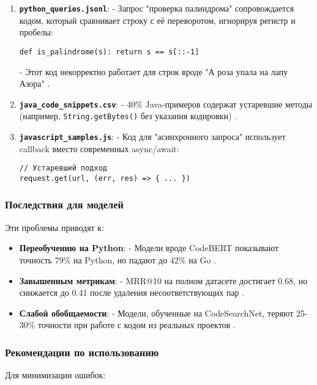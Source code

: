 \documentclass[14pt]{article}
\theoremstyle{definition}
\begin{document}
\begin{enumerate}
    \item \textbf{\texttt{python\_queries.jsonl}}:
    - Запрос "проверка палиндрома" сопровождается кодом, который сравнивает строку с её переворотом, игнорируя регистр и пробелы:
    \begin{verbatim}
def is_palindrome(s): return s == s[::-1]
    \end{verbatim}
    - Этот код некорректно работает для строк вроде "А роза упала на лапу Азора" \cite{chen2023}.
    
    \item \textbf{\texttt{java\_code\_snippets.csv}}:
    - 40\% Java-примеров содержат устаревшие методы (например, \texttt{String.getBytes()} без указания кодировки) \cite{guo2022graphcodebert}.
    
    \item \textbf{\texttt{javascript\_samples.js}}:
    - Код для "асинхронного запроса" использует callback вместо современных async/await:
    \begin{verbatim}
// Устаревший подход
request.get(url, (err, res) => { ... })
    \end{verbatim}
\end{enumerate}

\subsubsection{Последствия для моделей}
Эти проблемы приводят к:

\begin{itemize}
    \item \textbf{Переобучению на Python}: 
    - Модели вроде CodeBERT \cite{feng2020codebert} показывают точность 79\% на Python, но падают до 42\% на Go \cite{lu2021codexglue}.
    
    \item \textbf{Завышенным метрикам}: 
    - MRR@10 на полном датасете достигает 0.68, но снижается до 0.41 после удаления несоответствующих пар \cite{chen2023}.
    
    \item \textbf{Слабой обобщаемости}: 
    - Модели, обученные на CodeSearchNet, теряют 25-30\% точности при работе с кодом из реальных проектов \cite{allamanis2019adverse}.
\end{itemize}

\subsubsection{Рекомендации по использованию}
Для минимизации ошибок:
\end{document}
